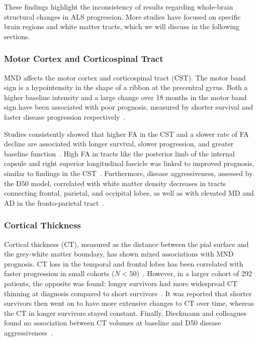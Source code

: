 These findings highlight the inconsistency of results regarding whole-brain structural changes in ALS progression.
More studies have focused on specific brain regions and white matter tracts, which we will discuss in the following sections.

\subsubsection*{Motor Cortex and Corticospinal Tract}
MND
affects the motor cortex and corticospinal tract (CST).
The motor band sign is a hypointensity in the shape of a ribbon at the precentral gyrus.
Both a higher baseline intensity and a large change over 18 months in the motor band sign have been associated with poor prognosis, measured by shorter survival and faster disease progression respectively~\cite{rizzoDiagnosticPrognosticValue2020,bollHypointensityMotorCortex2019}.

Studies consistently showed that higher FA in the CST and a slower rate of FA decline are associated with longer survival, slower progression, and greater baseline function~\cite{mullerLargescaleMulticentreCerebral2016, agostaMRIPredictorsLongterm2010, liBrainstemInvolvementAmyotrophic2021, menkeWidespreadGreyMatter2014, kalraProspectiveHarmonizedMulticenter2020}.
High FA in tracts like the posterior limb of the internal capsule and right superior longitudinal fascicle was linked to improved prognosis, similar to findings in the CST~\cite{menkeWidespreadGreyMatter2014,grolezMRICervicalSpinal2018}.
Furthermore, disease aggressiveness, assessed by the D50 model, correlated with white matter density decreases in tracts connecting frontal, parietal, and occipital lobes, as well as with elevated MD and AD in the fronto-parietal tract~\cite{steinbachDiseaseAggressivenessSignatures2021}.

\subsubsection*{Cortical Thickness}
Cortical thickness (CT), measured as the distance between the pial surface and the grey-white matter boundary, has shown mixed associations with MND prognosis.
CT loss in the temporal and frontal lobes has been correlated with faster progression in small cohorts ($N<50$)~\cite{dambrosioFrontotemporalCorticalThinning2014, verstraeteStructuralMRIReveals2012}.
However, in a larger cohort of 292 patients, the opposite was found: longer survivors had more widespread CT thinning at diagnosis compared to short survivors~\cite{burghMultimodalLongitudinalStudy2020}.
It was reported that shorter survivors then went on to have more extensive changes to CT over time, whereas the CT in longer survivors stayed constant.
Finally, Dieckmann and colleagues found no association between CT volumes at baseline and D50 disease aggressiveness~\cite{dieckmannCorticalSubcorticalGrey2022}.

